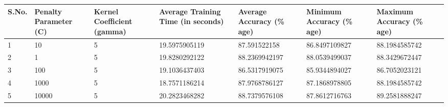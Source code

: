 \documentclass{beamer}
\begin{document}
\begin{frame}[t, allowframebreaks]
\begin{vwcol}[widths={6.5,3.0}, sep=.8cm, justify=flush, rule=0pt, indent=1em]
\begin{minipage}{0.7\linewidth}
\tiny
\begin{table}[!h]
\label{Fig:}
\fontsize{5}{6}\selectfont
\begin{tabular}{|p{0.3cm}|p{0.4cm}|p{0.6cm}|p{1.0cm}|p{1.0cm}|p{1.1cm}|p{1.0cm}|}
\hline
\textbf{S.No.}             & \textbf{Penalty Parameter (C)} & \textbf{Kernel Coefficient (gamma)} & \textbf{Average Training \linebreak Time \linebreak (in seconds)} & \textbf{Average \linebreak Accuracy \linebreak (\% age)} & \textbf{Minimum \linebreak Accuracy \linebreak (\% age)} & \textbf{Maximum \linebreak Accuracy \linebreak (\% age)} \\ \hline
1\rule{0pt}{3ex}\linebreak\linebreak             & 10                              & 5                                   & 19.5975905119                               & 87.591522158                       & 86.8497109827                     & 88.1984585742                     \\ \hline
2\rule{0pt}{3ex}\linebreak\linebreak              & 1                               & 5                                   & 19.8280292122                               & 88.2369942197                      & 88.0539499037                     & 88.3429672447                     \\ \hline
3\rule{0pt}{3ex}\linebreak\linebreak              & 100                             & 5                                   & 19.1036437403                               & 86.5317919075                      & 85.9344894027                     & 86.7052023121                     \\ \hline
4\rule{0pt}{3ex}\linebreak\linebreak              & 1000                            & 5                                   & 18.7571186214                               & 87.9768786127                      & 87.1868978805                     & 88.1984585742                     \\ \hline
5\rule{0pt}{3ex}\linebreak\linebreak              & 10000                           & 5                                   & 20.2823468282                               & 88.7379576108                      & 87.8612716763                     & 89.2581888247                     \\ \hline

\end{tabular}
\end{table}
\end{minipage}
\end{vwcol}
\end{frame}
\end{document}
